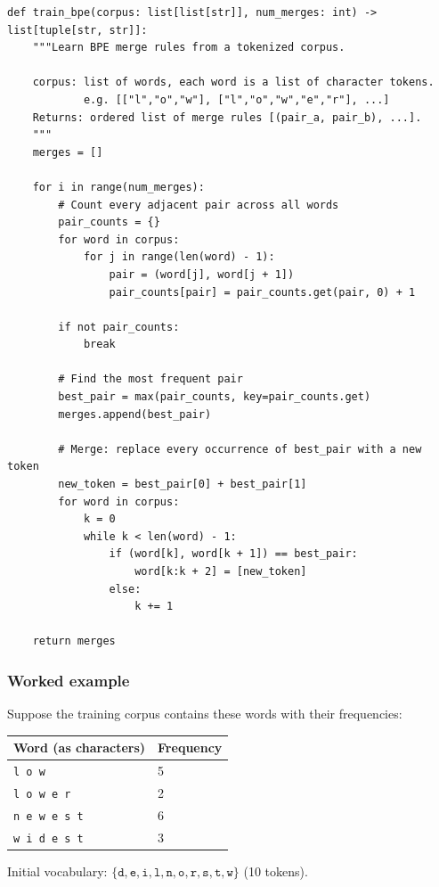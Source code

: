 \concepttag
\begin{lstlisting}
def train_bpe(corpus: list[list[str]], num_merges: int) -> list[tuple[str, str]]:
    """Learn BPE merge rules from a tokenized corpus.

    corpus: list of words, each word is a list of character tokens.
            e.g. [["l","o","w"], ["l","o","w","e","r"], ...]
    Returns: ordered list of merge rules [(pair_a, pair_b), ...].
    """
    merges = []

    for i in range(num_merges):
        # Count every adjacent pair across all words
        pair_counts = {}
        for word in corpus:
            for j in range(len(word) - 1):
                pair = (word[j], word[j + 1])
                pair_counts[pair] = pair_counts.get(pair, 0) + 1

        if not pair_counts:
            break

        # Find the most frequent pair
        best_pair = max(pair_counts, key=pair_counts.get)
        merges.append(best_pair)

        # Merge: replace every occurrence of best_pair with a new token
        new_token = best_pair[0] + best_pair[1]
        for word in corpus:
            k = 0
            while k < len(word) - 1:
                if (word[k], word[k + 1]) == best_pair:
                    word[k:k + 2] = [new_token]
                else:
                    k += 1

    return merges
\end{lstlisting}

\subsubsection{Worked example}

Suppose the training corpus contains these words with their frequencies:

\begin{center}
\begin{tabular}{ll}
\toprule
Word (as characters) & Frequency \\
\midrule
\texttt{l o w} & 5 \\
\texttt{l o w e r} & 2 \\
\texttt{n e w e s t} & 6 \\
\texttt{w i d e s t} & 3 \\
\bottomrule
\end{tabular}
\end{center}

Initial vocabulary: $\{\texttt{d}, \texttt{e}, \texttt{i}, \texttt{l}, \texttt{n}, \texttt{o}, \texttt{r}, \texttt{s}, \texttt{t}, \texttt{w}\}$ (10 tokens).

